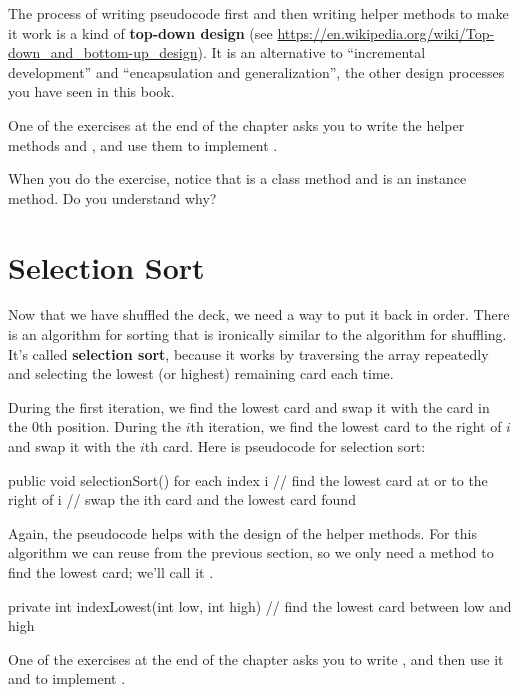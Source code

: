 The process of writing pseudocode first and then writing helper methods to make it work is a kind of {\bf top-down design} (see \url{https://en.wikipedia.org/wiki/Top-down_and_bottom-up_design}).
It is an alternative to ``incremental development'' and ``encapsulation and generalization'', the other design processes you have seen in this book.

One of the exercises at the end of the chapter asks you to write the helper methods  and , and use them to implement .

When you do the exercise, notice that  is a class method and  is an instance method.
Do you understand why?


\section{Selection Sort}
\label{sorting}


Now that we have shuffled the deck, we need a way to put it back in order.
There is an algorithm for sorting that is ironically similar to the algorithm for shuffling.
It's called {\bf selection sort}, because it works by traversing the array repeatedly and selecting the lowest (or highest) remaining card each time.

During the first iteration, we find the lowest card and swap it with the card in the 0th position.
During the $i$th iteration, we find the lowest card to the right of $i$ and swap it with the $i$th card.
Here is pseudocode for selection sort:

\begin{code}
public void selectionSort() {
    for each index i {
        // find the lowest card at or to the right of i
        // swap the ith card and the lowest card found
    }
}
\end{code}

Again, the pseudocode helps with the design of the helper methods.
For this algorithm we can reuse  from the previous section, so we only need a method to find the lowest card; we'll call it .

\begin{code}
private int indexLowest(int low, int high) {
    // find the lowest card between low and high
}
\end{code}

One of the exercises at the end of the chapter asks you to write , and then use it and  to implement .


